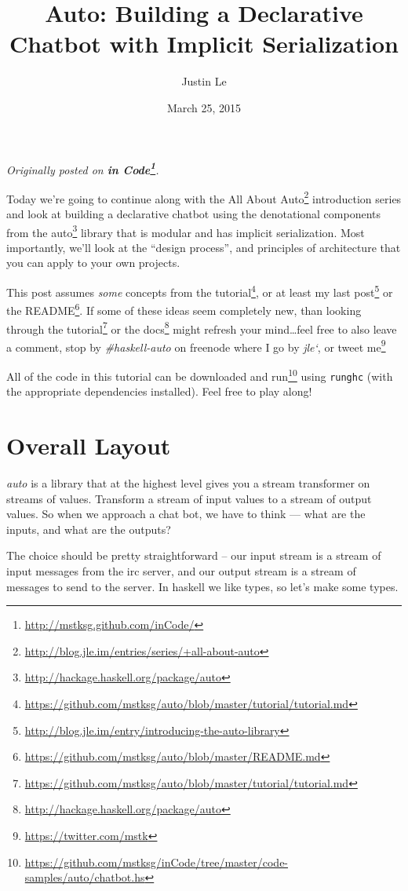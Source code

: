 \documentclass[]{article}
\title{Auto: Building a Declarative Chatbot with Implicit Serialization}
\author{Justin Le}
\date{March 25, 2015}
\renewcommand{\href}[2]{#2\footnote{\url{#1}}}
\begin{document}
\maketitle

\emph{Originally posted on
\textbf{\href{http://mstksg.github.com/inCode/}{in Code}}.}

Today we're going to continue along with the
\href{http://blog.jle.im/entries/series/+all-about-auto}{All About Auto}
introduction series and look at building a declarative chatbot using the
denotational components from the
\href{http://hackage.haskell.org/package/auto}{auto} library that is
modular and has implicit serialization. Most importantly, we'll look at
the ``design process'', and principles of architecture that you can
apply to your own projects.

This post assumes \emph{some} concepts from the
\href{https://github.com/mstksg/auto/blob/master/tutorial/tutorial.md}{tutorial},
or at least my
\href{http://blog.jle.im/entry/introducing-the-auto-library}{last post}
or the
\href{https://github.com/mstksg/auto/blob/master/README.md}{README}. If
some of these ideas seem completely new, than looking through the
\href{https://github.com/mstksg/auto/blob/master/tutorial/tutorial.md}{tutorial}
or the \href{http://hackage.haskell.org/package/auto}{docs} might
refresh your mind\ldots{}feel free to also leave a comment, stop by
\emph{\#haskell-auto} on freenode where I go by \emph{jle`}, or
\href{https://twitter.com/mstk}{tweet me}

All of the code in this tutorial can be
\href{https://github.com/mstksg/inCode/tree/master/code-samples/auto/chatbot.hs}{downloaded
and run} using \texttt{runghc} (with the appropriate dependencies
installed). Feel free to play along!

\section{Overall Layout}\label{overall-layout}

\emph{auto} is a library that at the highest level gives you a stream
transformer on streams of values. Transform a stream of input values to
a stream of output values. So when we approach a chat bot, we have to
think --- what are the inputs, and what are the outputs?

The choice should be pretty straightforward -- our input stream is a
stream of input messages from the irc server, and our output stream is a
stream of messages to send to the server. In haskell we like types, so
let's make some types.
\end{document}
